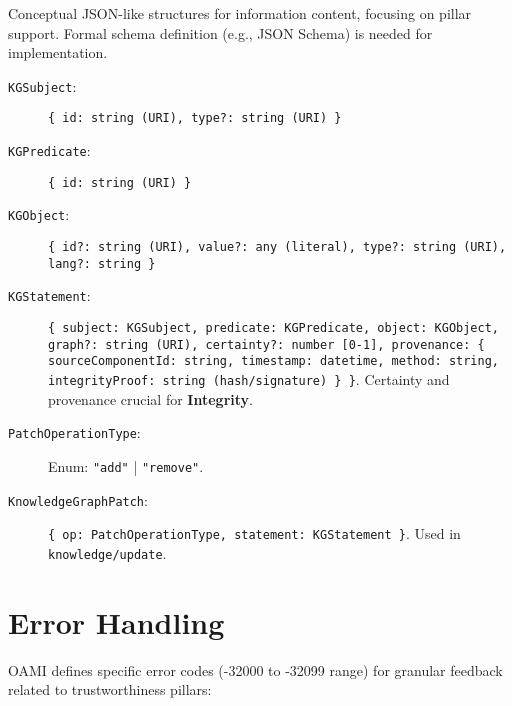 \documentclass[12pt,a4paper]{report}
\newcommand{\Integrity}{\textbf{Integrity}}
\begin{document}
	Conceptual JSON-like structures for information content, focusing on pillar support. Formal schema definition (e.g., JSON Schema) is needed for implementation.
	
	\begin{description}
		\item[\texttt{KGSubject}:] \texttt{\{ id: string (URI), type?: string (URI) \}}
		\item[\texttt{KGPredicate}:] \texttt{\{ id: string (URI) \}}
		\item[\texttt{KGObject}:] \texttt{\{ id?: string (URI), value?: any (literal), type?: string (URI), lang?: string \}}
		\item[\texttt{KGStatement}:] \texttt{\{ subject: KGSubject, predicate: KGPredicate, object: KGObject, graph?: string (URI), certainty?: number [0-1], provenance: \{ sourceComponentId: string, timestamp: datetime, method: string, integrityProof: string (hash/signature) \} \}}. Certainty and provenance crucial for \Integrity.
		\item[\texttt{PatchOperationType}:] Enum: \texttt{"add"} | \texttt{"remove"}.
		\item[\texttt{KnowledgeGraphPatch}:] \texttt{\{ op: PatchOperationType, statement: KGStatement \}}. Used in \texttt{knowledge/update}.
	\end{description}
	
	\section{Error Handling}
	\label{app:oami_errors}
	
	OAMI defines specific error codes (-32000 to -32099 range) for granular feedback related to trustworthiness pillars:
	
\end{document}
